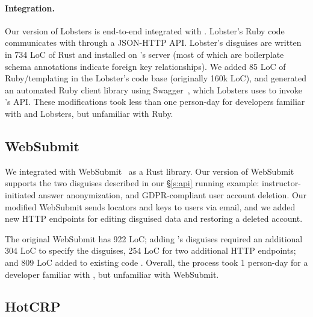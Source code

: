 \paragraph{Integration.}
%
Our version of Lobsters is end-to-end integrated with \sys.
%
Lobster's Ruby code communicates with \sys through a JSON-HTTP API.
Lobster's disguises are written in 734 LoC of Rust and installed on \sys's server (most of which are
boilerplate schema annotations indicate \eg foreign key relationships).
%
We added 85 LoC of Ruby/templating in the Lobster's code base (originally 160k LoC), and generated an
automated Ruby client library using Swagger~\cite{swagger}, which Lobsters uses to invoke \sys's
API.
%
These modifications took less than one person-day for developers familiar with
\sys and Lobsters, but unfamiliar with Ruby.

\subsection{WebSubmit}
\label{s:case-websubmit}

%
We integrated \sys with WebSubmit~\cite{websubmit-rs-anon} as a Rust library.
%
Our version of WebSubmit supports the two disguises described in our \S\ref{s:api}
running example: instructor-initiated answer anonymization, and GDPR-compliant
user account deletion.
%
Our modified WebSubmit sends locators and keys to users via email, and we added
new HTTP endpoints for editing disguised data and restoring a deleted account.
%

%
The original WebSubmit has 922 LoC; adding \sys's disguises required an additional 304 LoC
to specify the disguises, 254 LoC for two additional HTTP endpoints; and 809 LoC added to
existing code  .
%
Overall, the process took 1 person-day for a developer familiar with \sys, but
unfamiliar with WebSubmit.
%

\subsection{HotCRP}
\label{s:case-hotcrp}

